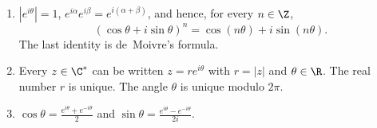 \begin{proposition}\label{prop:expform}
\begin{enumerate}[label=(\alph*)]
\item $|e^{i\theta}|=1$, $e^{i\alpha}e^{i\beta}=e^{i(\alpha+\beta)}$, and hence, for every $n\in\Z$,
\[
(\cos\theta+i\sin\theta)^n=\cos(n\theta)+i\sin(n\theta).
\]
The last identity is de~Moivre's formula.
\item Every $z\in\C^*$ can be written $z=re^{i\theta}$ with $r=|z|$ and $\theta\in\R$. The real number $r$ is unique. The angle $\theta$ is unique modulo $2\pi$.
\item $\displaystyle\cos\theta=\frac{e^{i\theta}+e^{-i\theta}}2$ and $\displaystyle\sin\theta=\frac{e^{i\theta}-e^{-i\theta}}{2i}$.
\end{enumerate}
\end{proposition}
